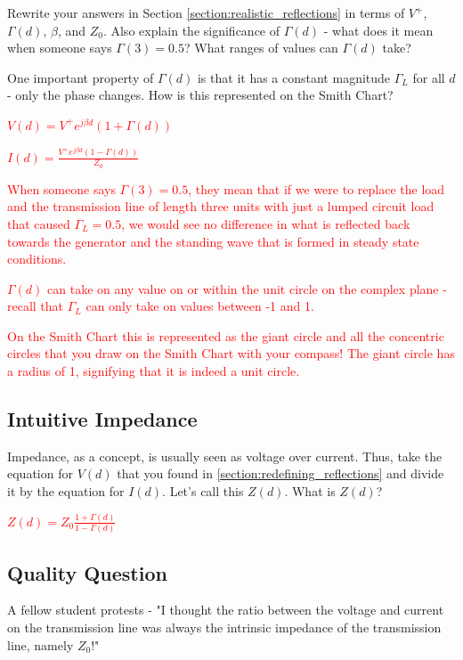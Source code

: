 \documentclass{article}
\begin{document}
Rewrite your answers in Section \ref{section:realistic_reflections} in terms of $V^+$, $\Gamma(d)$, $\beta$, and $Z_0$. Also explain the significance of $\Gamma(d)$ - what does it mean when someone says $\Gamma(3) = 0.5$? What ranges of values can $\Gamma(d)$ take?

One important property of $\Gamma(d)$ is that it has a constant magnitude $\Gamma_L$ for all $d$ - only the phase changes. How is this represented on the Smith Chart?

\textcolor{red}{$V(d) = V^+ e^{j\beta d}(1 + \Gamma(d))$}

\textcolor{red}{$I(d) = \frac{V^+ e^{j\beta d}(1 - \Gamma(d))}{Z_0}$}

\textcolor{red}{When someone says $\Gamma(3) = 0.5$, they mean that if we were to replace the load and the transmission line of length three units with just a lumped circuit load that caused $\Gamma_L = 0.5$, we would see no difference in what is reflected back towards the generator and the standing wave that is formed in steady state conditions.}

\textcolor{red}{$\Gamma(d)$ can take on any value on or within the unit circle on the complex plane - recall that $\Gamma_L$ can only take on values between -1 and 1.}

\textcolor{red}{On the Smith Chart this is represented as the giant circle and all the concentric circles that you draw on the Smith Chart with your compass! The giant circle has a radius of 1, signifying that it is indeed a unit circle.}

\vfill
\newpage

\subsection{Intuitive Impedance}

Impedance, as a concept, is usually seen as voltage over current. Thus, take the equation for $V(d)$ that you found in \ref{section:redefining_reflections} and divide it by the equation for $I(d)$. Let's call this $Z(d)$. What is $Z(d)$?

\textcolor{red}{$Z(d) = Z_0 \frac{1 + \Gamma(d)}{1 - \Gamma(d)}$}

\vfill

\subsection{Quality Question}

A fellow student protests - "I thought the ratio between the voltage and current on the transmission line was always the intrinsic impedance of the transmission line, namely $Z_0$!"
\end{document}
